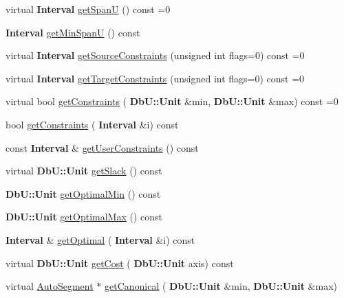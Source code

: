 \begin{DoxyCompactItemize}
\item 
virtual \textbf{ Interval} \hyperlink{classKatabatic_1_1AutoSegment_a248eb2fbb06e3286650b28567d495f0b}{get\+SpanU} () const =0
\item 
\textbf{ Interval} \hyperlink{classKatabatic_1_1AutoSegment_acc329583aa1546ed5a01e0628f3ca6ad}{get\+Min\+SpanU} () const
\item 
virtual \textbf{ Interval} \hyperlink{classKatabatic_1_1AutoSegment_ab7685e309e1d910db3e8237f8a898c35}{get\+Source\+Constraints} (unsigned int flags=0) const =0
\item 
virtual \textbf{ Interval} \hyperlink{classKatabatic_1_1AutoSegment_a9c1b8b3cd57fb7b0bf60c7a6148237c2}{get\+Target\+Constraints} (unsigned int flags=0) const =0
\item 
virtual bool \hyperlink{classKatabatic_1_1AutoSegment_a7c2fed22b081f8d3b7a69abb457153ea}{get\+Constraints} (\textbf{ Db\+U\+::\+Unit} \&min, \textbf{ Db\+U\+::\+Unit} \&max) const =0
\item 
bool \hyperlink{classKatabatic_1_1AutoSegment_a29c3a56daaf4c78aa3ae6edbde37dd42}{get\+Constraints} (\textbf{ Interval} \&i) const
\item 
const \textbf{ Interval} \& \hyperlink{classKatabatic_1_1AutoSegment_aa7cf8d4df6a5d945dd180d45e8bbcedf}{get\+User\+Constraints} () const
\item 
virtual \textbf{ Db\+U\+::\+Unit} \hyperlink{classKatabatic_1_1AutoSegment_a8789ebe71b2ff3d0265f5319a3be5afb}{get\+Slack} () const
\item 
\textbf{ Db\+U\+::\+Unit} \hyperlink{classKatabatic_1_1AutoSegment_a9405b4f5345d116f71c40ba2c16097d0}{get\+Optimal\+Min} () const
\item 
\textbf{ Db\+U\+::\+Unit} \hyperlink{classKatabatic_1_1AutoSegment_a1bada13dd4460386d4bed22c1a4b3921}{get\+Optimal\+Max} () const
\item 
\textbf{ Interval} \& \hyperlink{classKatabatic_1_1AutoSegment_a110201bd7c64ed78522cfb3f7b142431}{get\+Optimal} (\textbf{ Interval} \&i) const
\item 
virtual \textbf{ Db\+U\+::\+Unit} \hyperlink{classKatabatic_1_1AutoSegment_a0e3a02c7a9c1bd559fda628d596b00cd}{get\+Cost} (\textbf{ Db\+U\+::\+Unit} axis) const
\item 
virtual \hyperlink{classKatabatic_1_1AutoSegment}{Auto\+Segment} $\ast$ \hyperlink{classKatabatic_1_1AutoSegment_a8acbe1037827da2c2fef71a18c5886c7}{get\+Canonical} (\textbf{ Db\+U\+::\+Unit} \&min, \textbf{ Db\+U\+::\+Unit} \&max)
\item 

\end{DoxyCompactItemize}
